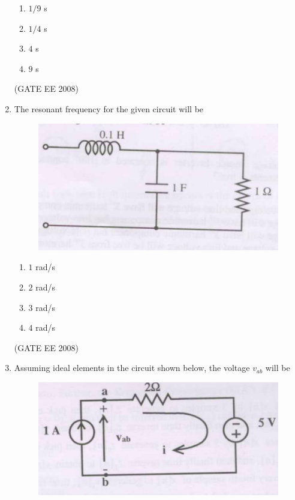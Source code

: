 \documentclass[journal,12pt,onecolumn]{IEEEtran}
\theoremstyle{remark}
\begin{document}
\begin{enumerate}[start=1, label=Q.\arabic*]
\begin{multicols}{4}
\begin{enumerate}[label=(\Alph*)]
    \item $1/9$ s
    \item $1/4$ s
    \item $4$ s
    \item $9$ s
\end{enumerate}
\end{multicols}
\hfill (GATE EE 2008)


\item The resonant frequency for the given circuit will be

\begin{figure}[H]
    \centering
    \includegraphics[width=\columnwidth]{Fig/q22.png}
\end{figure}

\begin{multicols}{4}
\begin{enumerate}[label=(\Alph*)]
    \item $1$ rad/s
    \item $2$ rad/s
    \item $3$ rad/s
    \item $4$ rad/s
\end{enumerate}
\end{multicols}
\hfill (GATE EE 2008)


\item Assuming ideal elements in the circuit shown below, the voltage $v_{ab}$ will be

\begin{figure}[H]
    \centering
    \includegraphics[width=\columnwidth]{Fig/q23.png}
\end{figure}


\end{enumerate}
\end{document}
